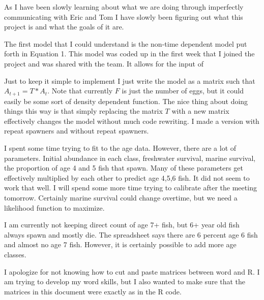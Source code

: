 \documentclass{report}
\begin{document}

As I have been slowly learning about what we are doing through
imperfectly communicating with Eric and Tom I have slowly been
figuring out what this project is and what the goals of it are.



The first model that I could understand is the non-time
dependent model put forth in Equation 1.  This model was coded up in
the first week that I joined the project and was shared with the
team. It allows for the input of 

























Just to keep it simple to implement I just write the model as a
matrix such that $A_{t+1}=T*A_t$.  Note that currently $F$ is just the
number of eggs, but it could easily be some sort of density dependent
function. The nice thing about doing things this way is that simply
replacing the matrix $T$ with a new matrix effectively changes the
model without much code rewriting. I made a version with repeat
spawners and without repeat spawners. 

I spent some time trying to fit to the age data. However, there are a
lot of parameters. Initial abundance in each class, freshwater
survival, marine survival, the proportion of age 4 and 5 fish that
spawn.  Many of these parameters get effectively multiplied by each
other to predict age 4,5,6 fish. It did not seem to work that well.
I will spend some more time trying to calibrate after the meeting
tomorrow.  Certainly marine survival could change overtime, but we
need a likelihood function to maximize. 


I am currently not keeping direct
count of age 7+ fish, but 6+ year old fish always spawn and mostly
die. The spreadsheet says there are 6 percent age 6 fish and almost no
age 7 fish.  However, it is certainly possible to add more age
classes.

I apologize for not knowing how to cut and paste matrices between word
and R. I am trying to develop my word skills, but I also wanted to
make sure that the matrices in this document were exactly as in the R
code. 
\end{document}
